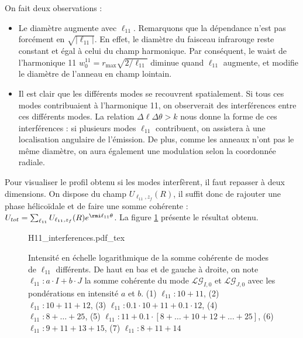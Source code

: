 On fait deux observations :
\begin{itemize} 
\item Le diamètre augmente avec $\ell_{11}$. Remarquons que la dépendance n'est pas forcément en $\sqrt{|\ell_{11}|}$. En effet, le diamètre du faisceau infrarouge reste constant et égal à celui du champ harmonique. Par conséquent, le waist de l'harmonique 11 $w_0^{11}=r_{\mathrm{max}}\sqrt{2/\ell_{11}}$ diminue quand $\ell_11$ augmente, et modifie le diamètre de l'anneau en champ lointain.\\
\item Il est clair que les différents modes se recouvrent spatialement. Si tous ces modes contribuaient à l'harmonique 11, on observerait des interférences entre ces différents modes. La relation $\Delta\ell\Delta\theta>k$ nous donne la forme de ces interférences : si plusieurs modes $\ell_{11}$ contribuent, on assistera à une localisation angulaire de l'émission. De plus, comme les anneaux n'ont pas le même diamètre, on aura également une modulation selon la coordonnée radiale.\\
\end{itemize}

Pour visualiser le profil obtenu si les modes interfèrent, il faut repasser à deux dimensions. On dispose du champ $U_{\ell_{11},z_f}(R)$, il suffit donc de rajouter une phase hélicoïdale et de faire une somme cohérente : $U_{tot}=\sum_{\ell_{11}} U_{\ell_{11},z_f}(R)e^{\rmi\ell_{11}\theta}$. La figure \ref{Fig:H11_interf} présente le résultat obtenu.

\begin{figure}[!ht]
\centering
\def\svgwidth{\columnwidth}
{H11_interferences.pdf_tex}
\caption{Intensité en échelle logarithmique de la somme cohérente de modes de $\ell_{11}$ différents. De haut en bas et de gauche à droite, on note $\ell_{11}:a\cdot I+b\cdot J$ la somme cohérente du mode $\mathcal{LG}_{I,0}$ et $\mathcal{LG}_{J,0}$ avec les pondérations en intensité $a$ et $b$.
(1) $\ell_{11}:10+11$, (2) $\ell_{11}:10+11+12$, (3) $\ell_{11}:0.1\cdot10+11+0.1\cdot12$, (4) $\ell_{11}:8+\ldots+ 25$, (5) $\ell_{11}:11+0.1\cdot\left[8+\ldots+10+12+\ldots+25\right]$, (6) $\ell_{11}:9+11+13+15$, (7) $\ell_{11}:8+11+14$}
\label{Fig:H11_interf}
\end{figure}


